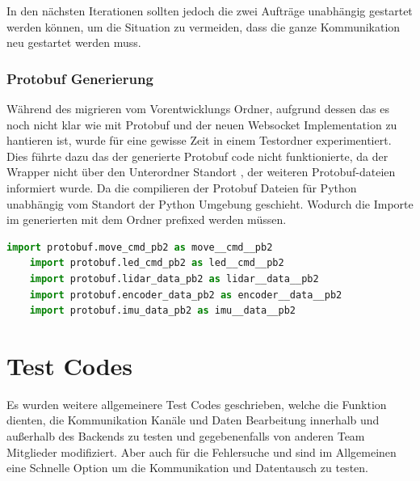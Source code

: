 In den nächsten Iterationen sollten jedoch 
die zwei Aufträge unabhängig gestartet werden können, 
um die Situation zu vermeiden, dass die ganze Kommunikation neu gestartet werden muss.

\subsubsection{Protobuf Generierung}
Während des migrieren vom Vorentwicklungs Ordner, 
aufgrund dessen das es noch nicht klar wie mit Protobuf 
und der neuen Websocket Implementation zu hantieren ist, 
wurde für eine gewisse Zeit in einem Testordner experimentiert.
Dies führte dazu das der generierte Protobuf code nicht funktionierte,
da der Wrapper nicht über den Unterordner Standort , 
der weiteren Protobuf-dateien informiert wurde.
Da die compilieren der Protobuf Dateien für Python unabhängig vom Standort
der Python Umgebung geschieht. 
Wodurch die Importe im generierten 
mit dem Ordner prefixed werden müssen.

\begin{lstlisting}[language=python, gobble=4]
    import protobuf.move_cmd_pb2 as move__cmd__pb2
    import protobuf.led_cmd_pb2 as led__cmd__pb2
    import protobuf.lidar_data_pb2 as lidar__data__pb2
    import protobuf.encoder_data_pb2 as encoder__data__pb2
    import protobuf.imu_data_pb2 as imu__data__pb2
\end{lstlisting}




\section{Test Codes}
Es wurden weitere allgemeinere Test Codes geschrieben, 
welche die Funktion dienten, die Kommunikation Kanäle und Daten Bearbeitung innerhalb 
und außerhalb des Backends zu testen und gegebenenfalls 
von anderen Team Mitglieder modifiziert.
% 
Aber auch für die Fehlersuche 
und sind im Allgemeinen eine Schnelle Option 
um die Kommunikation und Datentausch zu testen.

